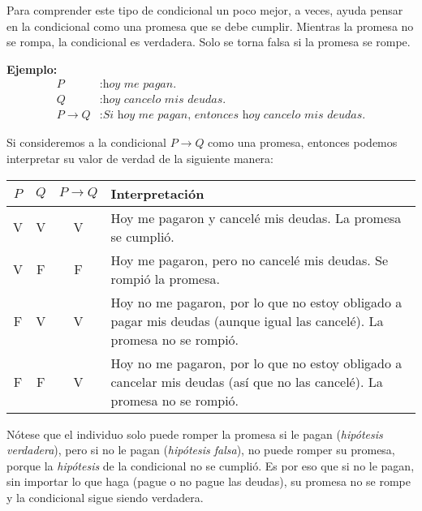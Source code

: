 Para comprender este tipo de condicional un poco mejor, a veces, ayuda pensar en la condicional como una promesa que se debe cumplir. Mientras la promesa no se rompa, la condicional es verdadera. Solo se torna falsa si la promesa se rompe. 

\textbf{Ejemplo:}
\begin{equation*}
    \begin{split}
        P &: \textit{hoy me pagan.} \\
        Q &: \textit{hoy cancelo mis deudas.} \\
        P \rightarrow Q &: \textit{Si hoy me pagan, entonces hoy cancelo mis deudas.}
    \end{split}
    \label{eq:condicional-ej02}
\end{equation*}

Si consideremos a la condicional $P \rightarrow Q$ como una promesa, entonces podemos interpretar su valor de verdad de la siguiente manera:

\begin{center}
    \begin{tabular}{c|c|c|m{20em}}
        $P$ & $Q$ & $P \rightarrow Q$ & Interpretación  \\
        \hline
        V & V & V & Hoy me pagaron y cancelé mis deudas. La promesa se cumplió. \\
        V & F & F & Hoy me pagaron, pero no cancelé mis deudas. Se rompió la promesa. \\
        F & V & V & Hoy no me pagaron, por lo que no estoy obligado a pagar mis deudas (aunque igual las cancelé). La promesa no se rompió. \\
        F & F & V & Hoy no me pagaron, por lo que no estoy obligado a cancelar mis deudas (así que no las cancelé). La promesa no se rompió.
    \end{tabular}
    \label{tab:condicional-tabla}
\end{center}

Nótese que el individuo solo puede romper la promesa si le pagan (\textit{hipótesis verdadera}), pero si no le pagan (\textit{hipótesis falsa}), no puede romper su promesa, porque la \textit{hipótesis} de la condicional no se cumplió. Es por eso que si no le pagan, sin importar lo que haga (pague o no pague las deudas), su promesa no se rompe y la condicional sigue siendo verdadera.

